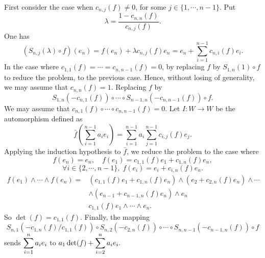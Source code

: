\begin{proofenv}
    \quad First consider the case when $c_{n,j}(f) \neq 0$, for some $j \in \{1,\cdots,n-1\}$.
    Put
    $$\lambda = \frac{1 - c_{n,n}(f)}{c_{n,j}(f)}.$$
    One has
    $$\left(S_{n,j}(\lambda)\circ f\right)(e_n) = f(e_n) + \lambda c_{n,j}(f) e_n = e_n + \sum_{i=1}^{n-1}c_{n,i}(f)e_{i}.$$
    In the case where $c_{1,1}(f) = \cdots = c_{n,n-1}(f) = 0$, by replacing $f$ by $S_{1,n}(1) \circ f$ to reduce the problem, to the previous case.
    Hence, without losing of generality, we may assume that $c_{n,n}(f) = 1$.
    Replacing $f$ by
    $$S_{1,n}(-c_{n,1}(f)) \circ \cdots \circ S_{n-1,n}(-c_{n,n-1}(f)) \circ f.$$
    We may assume that $c_{n,1}(f) \circ \cdots \circ c_{n,n-1}(f) = 0$.
    Let $I: W\rightarrow W$ be the automorphism defined as
    $$\bar{f}(\sum_{i=1}^{n-1}a_i e_i) = \sum_{i=1}^{n-1}a_i \sum_{j=1}^{n-1}c_{i,j}(f)e_j.$$
    Applying the induction hypothesis to $\bar{f}$, we reduce the problem to the case where
    $$f(e_n) = e_n,\quad f(e_1) = c_{1,1} (f) e_1 + c_{1,n} (f) e_n,$$
    $$\forall i \in \{2,\cdots,n-1\},\; f(e_i) = e_i + c_{i,n}(f) e_n.$$
    $$\begin{aligned}
        f(e_1) \wedge \cdots \wedge f(e_n) = & \left(c_{1,1}(f)e_1 + c_{1,n}(f) e_n\right) \wedge \left(e_2 + c_{2,n}(f) e_n\right) \wedge \cdots\\
            & \wedge \left(e_{n-1} + c_{n-1,n}(f) e_n\right) \wedge e_n\\
            & c_{1,1}(f) e_1 \wedge \cdots \wedge e_n.
    \end{aligned}$$
    So $\det(f) = c_{1,1} (f)$.
    Finally, the mapping
    $$S_{n,1}\left(-c_{1,n}(f)/c_{1,1}(f)\right) \circ S_{n,2}(-c_{2,n}(f)) \circ \cdots \circ S_{n,n-1}(-c_{n-1,n}(f)) \circ f$$
    sends $\displaystyle \sum_{i=1}^{n}a_ie_i$ to $\displaystyle a_1 \det(f) + \sum_{i=2}^{n}a_ie_i.$
\end{proofenv}

